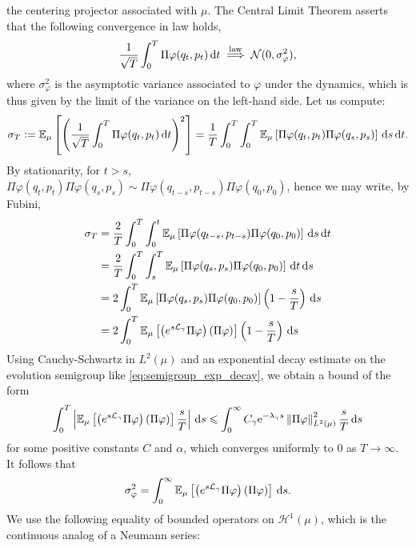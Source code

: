         the centering projector associated with $\mu$. The Central Limit Theorem asserts that the following convergence in law holds,
        \begin{equation}
            \label{eq:clt_diffusion}
            \frac1{\sqrt{T}}\int_0^T\Pi\varphi(q_t,p_t)\,\mathrm{d} t \overset{\mathrm{law}}{\implies} \mathcal N(0,\sigma_{\varphi}^2),
        \end{equation}
        where $\sigma_{\varphi}^2$ is the asymptotic variance associated to $\varphi$ under the dynamics, which is thus given by the limit of the variance on the left-hand side. Let us compute:
        \[\sigma_T\mathrel{\mathop:}= \mathbb{E}_\mu\left[\left(\frac1{\sqrt{T}}\int_0^T\Pi\varphi(q_t,p_t)\,\mathrm{d} t\right)^2\right]=\frac1T\int_0^T\int_0^T\mathbb{E}_\mu\left[\Pi\varphi(q_t,p_t)\Pi\varphi(q_s,p_s)\right]\,\mathrm{d} s\,\mathrm{d} t.\]
        By stationarity, for $t>s$, $\Pi\varphi(q_t,p_t)\Pi\varphi(q_s,p_s)\sim \Pi\varphi(q_{t-s},p_{t-s})\Pi\varphi(q_0,p_0)$, hence we may write, by Fubini, 
        \begin{align*}\sigma_T &= \frac2T\int_0^T\int_0^t\mathbb{E}_\mu\left[\Pi\varphi(q_{t-s},p_{t-s})\Pi\varphi(q_0,p_0)\right]\,\mathrm{d} s\,\mathrm{d} t\\
             &= \frac2T\int_0^T\int_s^T\mathbb{E}_\mu\left[\Pi\varphi(q_{s},p_{s})\Pi\varphi(q_0,p_0)\right]\,\mathrm{d} t\,\mathrm{d} s\\
             &=2\int_0^T\mathbb{E}_\mu\left[\Pi\varphi(q_{s},p_{s})\Pi\varphi(q_0,p_0)\right]\left(1-\frac{s}{T}\right)\,\mathrm{d} s\\
             &=2\int_0^T\mathbb{E}_\mu\left[\left(e^{s\mathcal{L}_\gamma}\Pi\varphi\right)\left(\Pi\varphi\right)\right]\left(1-\frac{s}{T}\right)\,\mathrm{d} s
        \end{align*}
        Using Cauchy-Schwartz in $L^2(\mu)$ and an exponential decay estimate on the evolution semigroup like \eqref{eq:semigroup_exp_decay}, we obtain a bound of the form
        \[\int_0^T\left|\mathbb{E}_\mu\left[\left(e^{s\mathcal{L}_\gamma}\Pi\varphi\right)\left(\Pi\varphi\right)\right]\frac{s}{T}\right|\,\mathrm{d} s\leqslant \int_0^\infty C_\gamma\mathrm{e}^{-\lambda_\gamma s}\left\|\Pi\varphi\right\|^2_{L^2(\mu)}\frac{s}{T}\,\mathrm{d} s\]
        for some positive constants $C$ and $\alpha$, which converges uniformly to $0$ as $T\to \infty$. It follows that 
        \begin{equation}
            \label{eq:asymptotic_variance_with_semigroup}
            \sigma_{\varphi}^2=\int_0^\infty \mathbb{E}_\mu\left[\left(e^{s\mathcal{L}_\gamma}\Pi\varphi\right)\left(\Pi\varphi\right)\right]\,\mathrm{d} s.
        \end{equation}
        We use the following equality of bounded operators on $\mathcal{H}^1(\mu)$, which is the continuous analog of a Neumann series:

